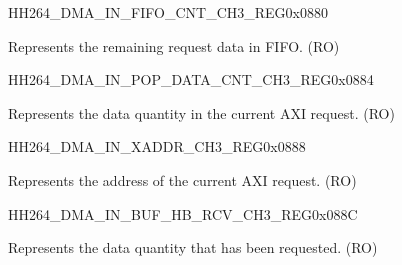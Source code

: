     \begin{register}{H}{H264\_DMA\_IN\_FIFO\_CNT\_CH3\_REG}{0x0880}\label{regdesc:H264DMAINFIFOCNTCH3REG}
    \regnewline%
    \begin{regdesc}\begin{reglist}
    \label{fielddesc:H264DMAINCMDFIFOINFIFOCNTCH3}\item [H264\_DMA\_IN\_CMDFIFO\_INFIFO\_CNT\_CH3] Represents the remaining request data in FIFO. (RO)
    \end{reglist}\end{regdesc}
    \end{register}
    
    
    \begin{register}{H}{H264\_DMA\_IN\_POP\_DATA\_CNT\_CH3\_REG}{0x0884}\label{regdesc:H264DMAINPOPDATACNTCH3REG}
    \regnewline%
    \begin{regdesc}\begin{reglist}
    \label{fielddesc:H264DMAINCMDFIFOPOPDATACNTCH3}\item [H264\_DMA\_IN\_CMDFIFO\_POP\_DATA\_CNT\_CH3] Represents the data quantity in the current AXI request. (RO)
    \end{reglist}\end{regdesc}
    \end{register}
    
    
    \begin{register}{H}{H264\_DMA\_IN\_XADDR\_CH3\_REG}{0x0888}\label{regdesc:H264DMAINXADDRCH3REG}
    \regnewline%
    \begin{regdesc}\begin{reglist}
    \label{fielddesc:H264DMAINCMDFIFOXADDRCH3}\item [H264\_DMA\_IN\_CMDFIFO\_XADDR\_CH3] Represents the address of the current AXI request. (RO)
    \end{reglist}\end{regdesc}
    \end{register}
    
    
    \begin{register}{H}{H264\_DMA\_IN\_BUF\_HB\_RCV\_CH3\_REG}{0x088C}\label{regdesc:H264DMAINBUFHBRCVCH3REG}
    \regnewline%
    \begin{regdesc}\begin{reglist}
    \label{fielddesc:H264DMAINCMDFIFOBUFHBRCVCH3}\item [H264\_DMA\_IN\_CMDFIFO\_BUF\_HB\_RCV\_CH3] Represents the data quantity that has been requested. (RO)
    \end{reglist}\end{regdesc}
    \end{register}
    
